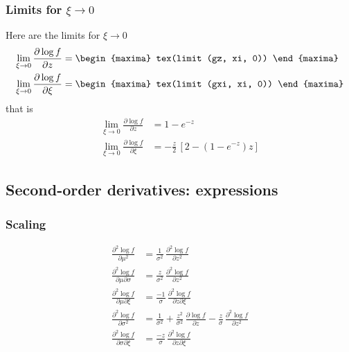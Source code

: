\subsubsection*{Limits for $\xi \to 0$}
Here are the limits for $\xi \to 0$
{\color{MonVertF}
  \begin{align*}
  \lim_{\xi \to 0} \frac{\partial \log f}{\partial z}
  &=
    \begin{maxima}
      tex(limit (gz, xi, 0))
    \end{maxima}
  \\
  \lim_{\xi \to 0} \frac{\partial \log f}{\partial \xi}
  &=
    \begin{maxima}
      tex(limit (gxi, xi, 0))
    \end{maxima}
\end{align*}}
that is
{\color{red}
  \begin{align*}
  \lim_{\xi \to 0} \frac{\partial \log f}{\partial z}
  &= 1 - e^{-z}
  \\
  \lim_{\xi \to 0} \frac{\partial \log f}{\partial \xi}
  &= -\frac{z}{2} \,\left[2 - (1 - e^{-z}) z \right] 
\end{align*}}



\subsection{Second-order derivatives: expressions}
\subsubsection*{Scaling}
{\color{red}
\begin{align*}
  \frac{\partial^2 \log f}{\partial \mu^2}
  &= \frac{1}{\sigma^2} \,
    \frac{\partial^2 \log f}{\partial z^2} \\
  \frac{\partial^2 \log f}{\partial \mu \partial \sigma}
  &= \frac{z}{\sigma^2} \,
    \frac{\partial^2 \log f}{\partial z^2} \\
  \frac{\partial^2 \log f}{\partial \mu \partial \xi}
  &= \frac{-1}{\sigma} \,
    \frac{\partial^2 \log f}{\partial z \partial \xi}\\
  \frac{\partial^2 \log f}{\partial \sigma^2}
  &= \frac{1}{\sigma^2} +
    \frac{z^2}{\sigma^2} \,\frac{\partial \log f}{\partial z}  -
    \frac{z}{\sigma} \,
    \frac{\partial^2 \log f}{\partial z^2}  \\
  \frac{\partial^2 \log f}{\partial \sigma \partial \xi}
  &= \frac{-z}{\sigma} \,
    \frac{\partial^2 \log f}{\partial z \partial \xi} 
\end{align*}
}

